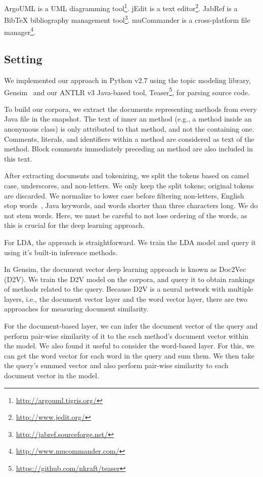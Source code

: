 ArgoUML is a UML diagramming tool\footnote{\url{http://argouml.tigris.org/}}.
jEdit is a text editor\footnote{\url{http://www.jedit.org/}}.
JabRef is a BibTeX bibliography management tool\footnote{\url{http://jabref.sourceforge.net/}}.
muCommander is a cross-platform file manager\footnote{\url{http://www.mucommander.com/}}.

\subsection{Setting}

We implemented our approach in Python v2.7 using the topic modeling library,
Gensim~\cite{Rehurek-Sojk_2010} and our ANTLR v3 Java-based tool,
Teaser\footnote{\url{https://github.com/nkraft/teaser}}, for parsing source
code.

To build our corpora, we extract the documents representing methods from every
Java file in the snapshot.  The text of inner an method (e.g., a method inside
an anonymous class) is only attributed to that method, and not the containing
one.  Comments, literals, and identifiers within a method are considered as text
of the method.  Block comments immediately preceding an method are also included
in this text.

After extracting documents and tokenizing, we split the tokens based on camel
case, underscores, and non-letters.  We only keep the split tokens; original
tokens are discarded.  We normalize to lower case before filtering non-letters,
English stop words~\cite{Fox_1992}, Java keywords, and words shorter than three
characters long.  We do not stem words. Here, we must be careful to not lose
ordering of the words, as this is crucial for the deep learning approach.

For LDA, the approach is straightforward. We train the LDA model and query it
using it's built-in inference methods.

In Gensim, the document vector deep learning approach is known as Doc2Vec (D2V).
We train the D2V model on the corpora, and query it to obtain rankings of
methods related to the query. Because D2V is a neural network with multiple
layers, i.e., the document vector layer and the word vector layer, there are two
approaches for measuring document similarity.

For the document-based layer, we can infer the document vector of the query and
perform pair-wise similarity of it to the each method's document vector within
the model.  We also found it useful to consider the word-based layer. For this,
we can get the word vector for each word in the query and sum them. We then take
the query's summed vector and also perform pair-wise similarity to each document
vector in the model.

